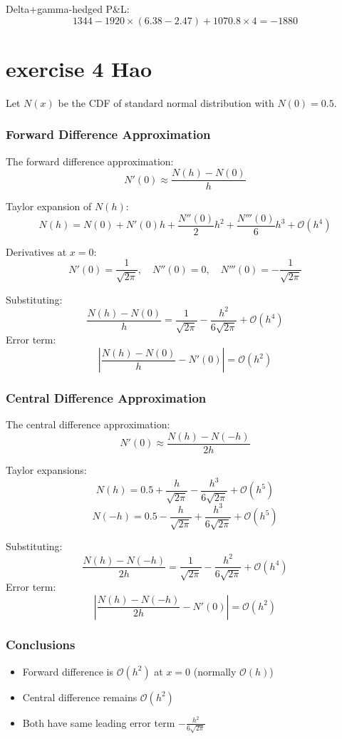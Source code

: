 \documentclass{article}
\begin{document}
Delta+gamma-hedged P\&L:
\[
1344 - 1920\times(6.38-2.47) + 1070.8\times4 = -1880
\]


\section{exercise 4 Hao}

Let $N(x)$ be the CDF of standard normal distribution with $N(0)=0.5$.

\subsubsection*{Forward Difference Approximation}
The forward difference approximation:
\[
N'(0) \approx \frac{N(h)-N(0)}{h}
\]

Taylor expansion of $N(h)$:
\[
N(h) = N(0) + N'(0)h + \frac{N''(0)}{2}h^2 + \frac{N'''(0)}{6}h^3 + \mathcal{O}(h^4)
\]

Derivatives at $x=0$:
\[
N'(0) = \frac{1}{\sqrt{2\pi}}, \quad N''(0)=0, \quad N'''(0)=-\frac{1}{\sqrt{2\pi}}
\]

Substituting:
\[
\frac{N(h)-N(0)}{h} = \frac{1}{\sqrt{2\pi}} - \frac{h^2}{6\sqrt{2\pi}} + \mathcal{O}(h^4)
\]
Error term:
\[
\left|\frac{N(h)-N(0)}{h}-N'(0)\right| = \mathcal{O}(h^2)
\]

\subsubsection*{Central Difference Approximation}
The central difference approximation:
\[
N'(0) \approx \frac{N(h)-N(-h)}{2h}
\]

Taylor expansions:
\[
N(h) = 0.5 + \frac{h}{\sqrt{2\pi}} - \frac{h^3}{6\sqrt{2\pi}} + \mathcal{O}(h^5)
\]
\[
N(-h) = 0.5 - \frac{h}{\sqrt{2\pi}} + \frac{h^3}{6\sqrt{2\pi}} + \mathcal{O}(h^5)
\]

Substituting:
\[
\frac{N(h)-N(-h)}{2h} = \frac{1}{\sqrt{2\pi}} - \frac{h^2}{6\sqrt{2\pi}} + \mathcal{O}(h^4)
\]
Error term:
\[
\left|\frac{N(h)-N(-h)}{2h}-N'(0)\right| = \mathcal{O}(h^2)
\]

\subsubsection*{Conclusions}
\begin{itemize}
\item Forward difference is $\mathcal{O}(h^2)$ at $x=0$ (normally $\mathcal{O}(h)$)
\item Central difference remains $\mathcal{O}(h^2)$
\item Both have same leading error term $-\frac{h^2}{6\sqrt{2\pi}}$
\end{itemize}
\end{document}
